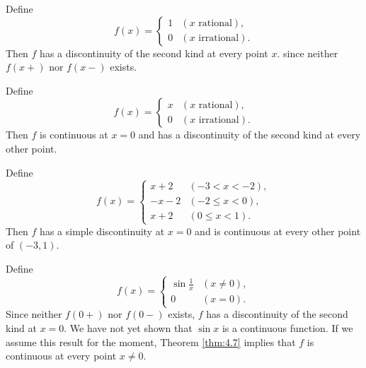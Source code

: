 \begin{myExample}
    \begin{asparaenum}[(a)]
        \item Define 
    \begin{equation*}
        f(x) = \left\{
            \begin{array}{lc}
                1 & (x \text{ rational}),\\
                0 & (x \text{ irrational}).
            \end{array}
        \right.
    \end{equation*}
    Then $f$ has a discontinuity of the second kind at every point $x$. 
    since neither $f(x+)$ nor $f(x-)$ exists.
    \item Define
    \begin{equation*}
        f(x) = \left\{
            \begin{array}{lc}
                x & (x \text{ rational}),\\
                0 & (x \text{ irrational}).
            \end{array}
        \right.
    \end{equation*}
    Then $f$ is continuous at $x = 0$ and has a discontinuity of the second kind at every other point.

    \item Define 
    \begin{equation*}
        f(x) = \left\{
            \begin{array}{lc}
                 x + 2  & (-3 <    x < -2),\\
                -x - 2  & (-2 \leq x <  0),\\
                 x + 2  & ( 0 \leq x <  1).
            \end{array}
        \right.
    \end{equation*}
    Then $f$ has a simple discontinuity at $x = 0$ and is continuous at every other point of $(-3, 1)$.
    \item Define
    \begin{equation*}
        f(x) = \left\{
            \begin{array}{lc}
                \sin \frac{1}{x} & (x \neq 0),\\
                0 & (x = 0).
            \end{array}
        \right.
    \end{equation*}
    Since neither $f(0+)$ nor $f(0-)$ exists,
    $f$ has a discontinuity of the second kind at $x = 0$. 
    We have not yet shown that $\sin x$ is a continuous function. 
    If we assume this result for the moment, 
    Theorem \ref{thm:4.7} implies that $f$ is continuous at every point $x \neq 0$.
    \end{asparaenum}
\end{myExample}